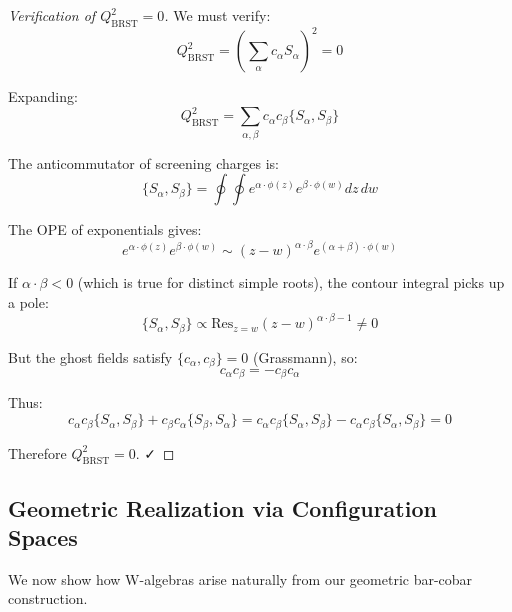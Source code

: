 \begin{proof}[Verification of $Q_{\text{BRST}}^2 = 0$]
We must verify:
\begin{equation}
Q_{\text{BRST}}^2 = \left(\sum_\alpha c_\alpha S_\alpha\right)^2 = 0
\end{equation}

Expanding:
\begin{equation}
Q_{\text{BRST}}^2 = \sum_{\alpha, \beta} c_\alpha c_\beta \{S_\alpha, S_\beta\}
\end{equation}

The anticommutator of screening charges is:
\begin{equation}
\{S_\alpha, S_\beta\} = \oint \oint e^{\alpha \cdot \phi(z)} e^{\beta \cdot \phi(w)} 
dz \, dw
\end{equation}

The OPE of exponentials gives:
\begin{equation}
e^{\alpha \cdot \phi(z)} e^{\beta \cdot \phi(w)} \sim (z-w)^{\alpha \cdot \beta} 
e^{(\alpha + \beta) \cdot \phi(w)}
\end{equation}

If $\alpha \cdot \beta < 0$ (which is true for distinct simple roots), the contour 
integral picks up a pole:
\begin{equation}
\{S_\alpha, S_\beta\} \propto \text{Res}_{z=w} (z-w)^{\alpha \cdot \beta - 1} \neq 0
\end{equation}

But the ghost fields satisfy $\{c_\alpha, c_\beta\} = 0$ (Grassmann), so:
\begin{equation}
c_\alpha c_\beta = -c_\beta c_\alpha
\end{equation}

Thus:
\begin{equation}
c_\alpha c_\beta \{S_\alpha, S_\beta\} + c_\beta c_\alpha \{S_\beta, S_\alpha\} = 
c_\alpha c_\beta \{S_\alpha, S_\beta\} - c_\alpha c_\beta \{S_\alpha, S_\beta\} = 0
\end{equation}

Therefore $Q_{\text{BRST}}^2 = 0$. ✓
\end{proof}

\subsection{Geometric Realization via Configuration Spaces}
\label{sec:w-algebra-geometric-realization-complete}

We now show how W-algebras arise naturally from our geometric bar-cobar construction.

